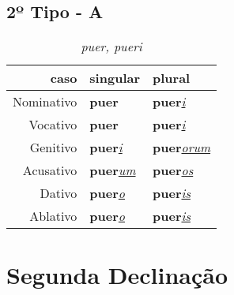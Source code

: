 \documentclass{article}
\newcommand{\radicaldesinencia}[2]{\textbf{#1}\textit{\underline{#2}}}
\begin{document}
\subsection*{2º Tipo - A}
\begin{table}[H]
\centering
\caption*{\textit{puer, pueri}}
\vspace{0.2cm}
\begin{tabular}{r|l|l}
\hline
caso			&	singular					& plural 								\\
\hline                                    		
\hline
Nominativo	&	\radicaldesinencia{puer}{}		& \radicaldesinencia{puer}{i}			\\
Vocativo		&	\radicaldesinencia{puer}{}		& \radicaldesinencia{puer}{i}			\\
Genitivo		&	\radicaldesinencia{puer}{i}		& \radicaldesinencia{puer}{orum}		\\
Acusativo	&	\radicaldesinencia{puer}{um}	& \radicaldesinencia{puer}{os}	\\
Dativo		&	\radicaldesinencia{puer}{o}		& \radicaldesinencia{puer}{is}		\\
Ablativo		&	\radicaldesinencia{puer}{o}		& \radicaldesinencia{puer}{is}		\\


 \hline
\end{tabular}
\end{table}
\clearpage





\section*{Segunda Declinação}
\end{document}
